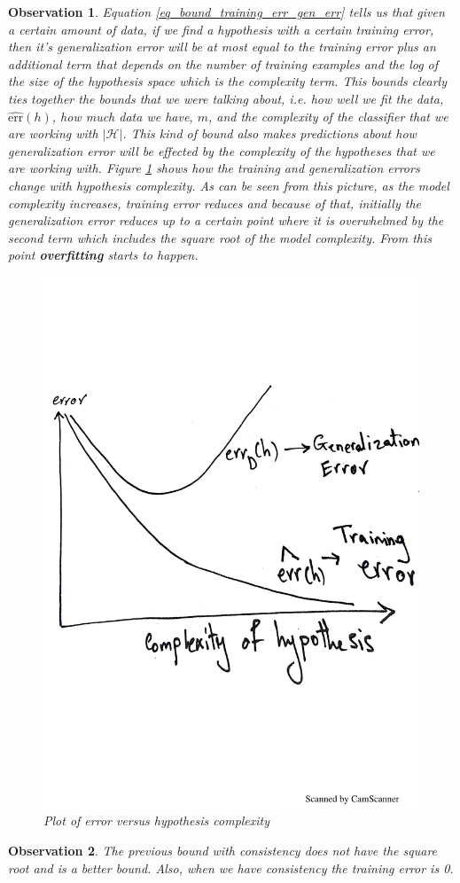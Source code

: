 \documentclass[10pt ]{article}
\newtheorem{obs}{Observation}
\begin{document}
\begin{obs}{\em
Equation \eqref{eq_bound_training_err_gen_err} tells us that given a certain amount of data,  if we find a hypothesis with a certain training error, then it's generalization error will be at most equal to the training error plus an additional term that depends on the number of training examples and the log of the size of the hypothesis space which is the complexity term. This bounds clearly ties together the bounds that we were talking about, i.e. how well we fit the data, $\widehat{\mathrm{err}}(h)$, how much data we have, $m$, and the complexity of the classifier that we are working with $|\mathcal{H}|$. This kind of bound also makes predictions about how generalization error will be effected by the complexity of the hypotheses that we are working with. Figure \ref{fig_tradeof_complexity} shows how the training and generalization errors change with hypothesis complexity. As can be seen from this picture, as the model complexity increases, training error reduces and because of that, initially the generalization error reduces up to a certain point where it is overwhelmed by the second term which includes the square root of the model complexity. From this point \textbf{overfitting} starts to happen.
\begin{figure}[ht]
\centering
 \includegraphics[height=0.5\textwidth]{overfitting.pdf} 
 \caption{Plot of error versus hypothesis complexity}
 \label{fig_tradeof_complexity}
\end{figure}
}
\end{obs}
\begin{obs}
{\em 
The previous bound with consistency does not have the square root and is a better bound. Also, when we have consistency the training error is 0. 
}
\end{obs}
\end{document}
